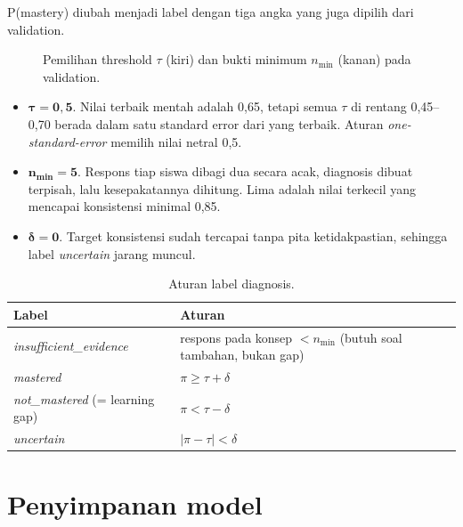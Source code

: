 \documentclass[11pt,a4paper]{article}
\begin{document}
P(mastery) diubah menjadi label dengan tiga angka yang juga dipilih dari validation.

\begin{figure}[h]
  \centering
  \setlength\figH{4.6cm}
  \begin{minipage}{0.48\linewidth}\end{minipage}\hfill
  \begin{minipage}{0.48\linewidth}\end{minipage}
  \caption{Pemilihan threshold $\tau$ (kiri) dan bukti minimum $n_{\min}$ (kanan) pada validation.}
\end{figure}

\begin{itemize}
  \item $\boldsymbol{\tau=0{,}5}$. Nilai terbaik mentah adalah 0,65, tetapi semua $\tau$ di rentang 0,45--0,70 berada
        dalam satu standard error dari yang terbaik. Aturan \emph{one-standard-error} memilih nilai netral 0,5.
  \item $\boldsymbol{n_{\min}=5}$. Respons tiap siswa dibagi dua secara acak, diagnosis dibuat terpisah, lalu
        kesepakatannya dihitung. Lima adalah nilai terkecil yang mencapai konsistensi minimal 0,85.
  \item $\boldsymbol{\delta=0}$. Target konsistensi sudah tercapai tanpa pita ketidakpastian, sehingga label
        \emph{uncertain} jarang muncul.
\end{itemize}

\begin{table}[h]
  \centering\small
  \begin{tabular}{@{}ll@{}}
    \toprule
    Label & Aturan \\
    \midrule
    \emph{insufficient\_evidence} & respons pada konsep $<n_{\min}$ (butuh soal tambahan, bukan gap) \\
    \emph{mastered} & $\pi\ge\tau+\delta$ \\
    \emph{not\_mastered} (= learning gap) & $\pi<\tau-\delta$ \\
    \emph{uncertain} & $|\pi-\tau|<\delta$ \\
    \bottomrule
  \end{tabular}
  \caption{Aturan label diagnosis.}
\end{table}

\section{Penyimpanan model}
\end{document}
